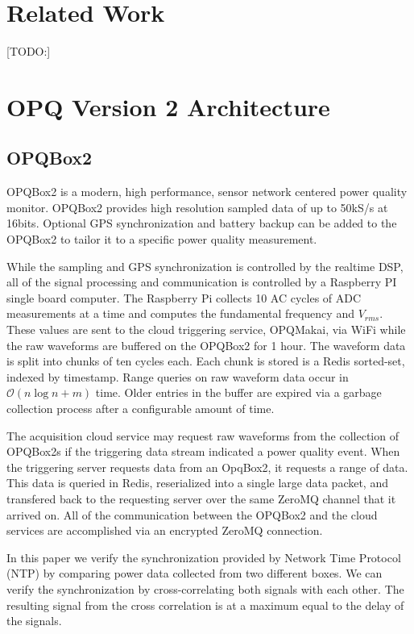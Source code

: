 \documentclass[conference]{IEEEtran}
\begin{document}
\section{Related Work}
[TODO:]

\section{OPQ Version 2 Architecture}
\subsection{OPQBox2}
OPQBox2 is a modern, high performance, sensor network centered power quality monitor. OPQBox2 provides high resolution sampled data of up to 50kS/s at 16bits. Optional GPS synchronization and battery backup can be added to the OPQBox2 to tailor it to a specific power quality measurement. 

While the sampling and GPS synchronization is controlled by the realtime DSP, all of the signal processing and communication is controlled by a Raspberry PI single board computer. The Raspberry Pi collects 10 AC cycles of ADC measurements at a time and computes the fundamental frequency and $V_{rms}$. These values are sent to the cloud triggering service, OPQMakai, via WiFi while the raw waveforms are buffered on the OPQBox2 for 1 hour. The waveform data is split into chunks of ten cycles each. Each chunk is stored is a Redis sorted-set, indexed by timestamp. Range queries on raw waveform data occur in $\mathcal{O}(n\log{}n + m)$ time. Older entries in the buffer are expired via a garbage collection process after a configurable amount of time. 

The acquisition cloud service may request raw waveforms from the collection of OPQBox2s if the triggering data stream indicated a power quality event. When the triggering server requests data from an OpqBox2, it requests a range of data. This data is queried in Redis, reserialized into a single large data packet, and transfered back to the requesting server over the same ZeroMQ channel that it arrived on. All of the communication between the OPQBox2 and the cloud services are accomplished via an encrypted ZeroMQ connection.

In this paper we verify the synchronization provided by Network Time Protocol (NTP) by comparing power data collected from two different boxes. We can verify the synchronization by cross-correlating both signals with each other. The resulting signal from the cross correlation is at a maximum equal to the delay of the signals.
\end{document}

